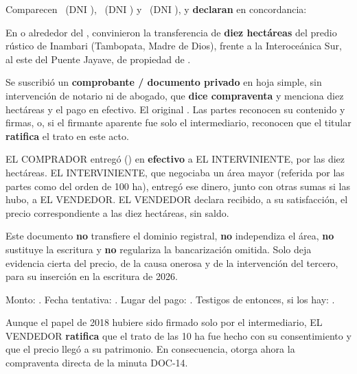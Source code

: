 \documentclass[12pt,a4paper]{article}
\begin{document}


\noindent Comparecen \VendedorNombreCompleto\ (DNI \VendedorDNI), \CompradorNombreCompleto\ (DNI \CompradorDNI) y \IntermediarioNombre\ (DNI \IntermediarioDNI), y \textbf{declaran} en concordancia:

En o alrededor del \textbf{\FechaPago}, convinieron la transferencia de \textbf{diez hectáreas} del predio rústico de Inambari (Tambopata, Madre de Dios), frente a la Interoceánica Sur, al este del Puente Jayave, de propiedad de \VendedorNombreCompleto.

Se suscribió un \textbf{comprobante / documento privado} en hoja simple, sin intervención de notario ni de abogado, que \textbf{dice compraventa} y menciona diez hectáreas y el pago en efectivo. El original . Las partes reconocen su contenido y firmas, o, si el firmante aparente fue solo el intermediario, reconocen que el titular \textbf{ratifica} el trato en este acto.

EL COMPRADOR entregó \textbf{\MontoPago} (\MontoPagoLetras) en \textbf{efectivo} a EL INTERVINIENTE, por las diez hectáreas. EL INTERVINIENTE, que negociaba un área mayor (referida por las partes como del orden de 100 ha), entregó ese dinero, junto con otras sumas si las hubo, a EL VENDEDOR. EL VENDEDOR declara recibido, a su satisfacción, el precio correspondiente a las diez hectáreas, sin saldo.

Este documento \textbf{no} transfiere el dominio registral, \textbf{no} independiza el área, \textbf{no} sustituye la escritura y \textbf{no} regulariza la bancarización omitida. Solo deja evidencia cierta del precio, de la causa onerosa y de la intervención del tercero, para su inserción en la escritura de 2026.

Monto: \MontoPago. Fecha tentativa: \FechaPago. Lugar del pago: . Testigos de entonces, si los hay: \faltante{[nombres]}.

Aunque el papel de 2018 hubiere sido firmado solo por el intermediario, EL VENDEDOR \textbf{ratifica} que el trato de las 10 ha fue hecho con su consentimiento y que el precio llegó a su patrimonio. En consecuencia, otorga ahora la compraventa directa de la minuta DOC-14.
\end{document}

